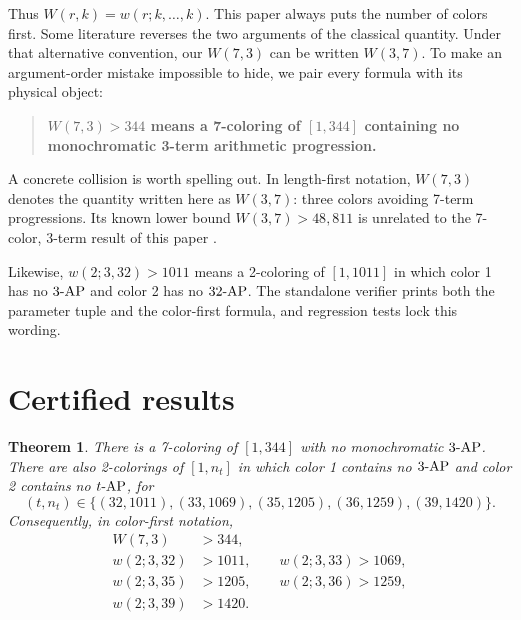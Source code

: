 \documentclass[11pt]{article}
\newtheorem{theorem}{Theorem}
\newcommand{\interval}[1]{[1,#1]}
\newcommand{\ap}{\textnormal{-AP}}
\begin{document}
Thus \(W(r,k)=w(r;k,\ldots,k)\).  This paper always puts the number of colors
first.  Some literature reverses the two arguments of the classical
quantity.  Under that alternative convention, our \(W(7,3)\) can be written
\(W(3,7)\).  To make an argument-order mistake impossible to hide, we pair
every formula with its physical object:

\begin{quote}
\textbf{\(W(7,3)>344\) means a 7-coloring of \(\interval{344}\) containing
no monochromatic 3-term arithmetic progression.}
\end{quote}

A concrete collision is worth spelling out.  In length-first notation,
\(W(7,3)\) denotes the quantity written here as \(W(3,7)\): three colors
avoiding 7-term progressions.  Its known lower bound
\(W(3,7)>48{,}811\) is unrelated to the 7-color, 3-term result of this paper
\cite{rabung2012,leaps2026}.

Likewise, \(w(2;3,32)>1011\) means a 2-coloring of
\(\interval{1011}\) in which color 1 has no \(3\ap\) and color 2 has no
\(32\ap\).  The standalone verifier prints both the parameter tuple and the
color-first formula, and regression tests lock this wording.

\section{Certified results}
\label{sec:results}

\begin{theorem}
\label{thm:main}
There is a 7-coloring of \(\interval{344}\) with no monochromatic
\(3\ap\).  There are also 2-colorings of \(\interval{n_t}\) in which color
1 contains no \(3\ap\) and color 2 contains no \(t\ap\), for
\[
  (t,n_t)\in
  \{(32,1011),(33,1069),(35,1205),(36,1259),(39,1420)\}.
\]
Consequently, in color-first notation,
\[
\begin{split}
W(7,3)&>344,\\
w(2;3,32)&>1011,\qquad w(2;3,33)>1069,\\
w(2;3,35)&>1205,\qquad w(2;3,36)>1259,\\
w(2;3,39)&>1420.
\end{split}
\]
\end{theorem}
\end{document}
